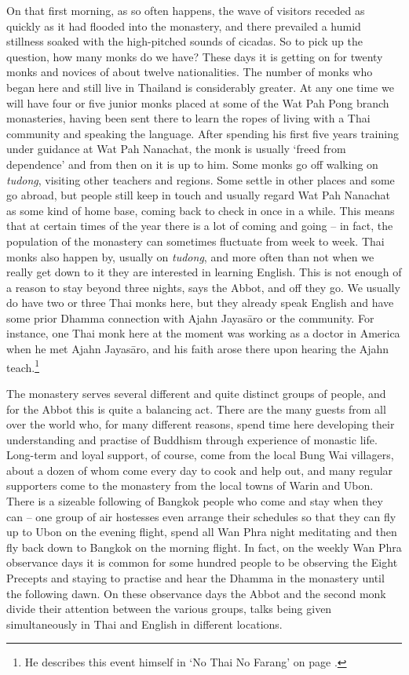 On that first morning, as so often happens, the wave of visitors receded
as quickly as it had flooded into the monastery, and there prevailed a
humid stillness soaked with the high-pitched sounds of cicadas. So to
pick up the question, how many monks do we have? These days it is
getting on for twenty monks and novices of about twelve nationalities. 
The number of monks who began here and still live in Thailand is
considerably greater. At any one time we will have four or five junior
monks placed at some of the Wat Pah Pong branch monasteries, having been
sent there to learn the ropes of living with a Thai community and speaking
the language. After spending his first five years training under
guidance at Wat Pah Nanachat, the monk is usually `freed from
dependence' and from then on it is up to him. Some monks go off walking
on \emph{tudong}, visiting other teachers and regions. Some settle in
other places and some go abroad, but people still keep in touch and
usually regard Wat Pah Nanachat as some kind of home base, coming back
to check in once in a while. This means that at certain times of the
year there is a lot of coming and going -- in fact, the population of
the monastery can sometimes fluctuate from week to week. Thai monks also
happen by, usually on \emph{tudong}, and more often than not when we
really get down to it they are interested in learning English. This is
not enough of a reason to stay beyond three nights, says the Abbot, and
off they go. We usually do have two or three Thai monks here, but they
already speak English and have some prior Dhamma connection with Ajahn
Jayasāro or the community. For instance, one Thai monk here at the
moment was working as a doctor in America when he met Ajahn Jayasāro, 
and his faith arose there upon hearing the Ajahn teach.\footnote{He
  describes this event himself in `No Thai No Farang' on page \pageref{no-thai-no-farang}.}

The monastery serves several different and quite distinct groups of
people, and for the Abbot this is quite a balancing act. There are the
many guests from all over the world who, for many different reasons, 
spend time here developing their understanding and practise of Buddhism
through experience of monastic life. Long-term and loyal support, of
course, come from the local Bung Wai villagers, about a dozen of whom
come every day to cook and help out, and many regular supporters come to
the monastery from the local towns of Warin and Ubon. There is a
sizeable following of Bangkok people who come and stay when they can --
one group of air hostesses even arrange their schedules so that they can
fly up to Ubon on the evening flight, spend all Wan Phra night
meditating and then fly back down to Bangkok on the morning flight. In
fact, on the weekly Wan Phra observance days it is common for some
hundred people to be observing the Eight Precepts and staying to
practise and hear the Dhamma in the monastery until the following dawn. 
On these observance days the Abbot and the second monk divide their
attention between the various groups, talks being given simultaneously
in Thai and English in different locations. 

